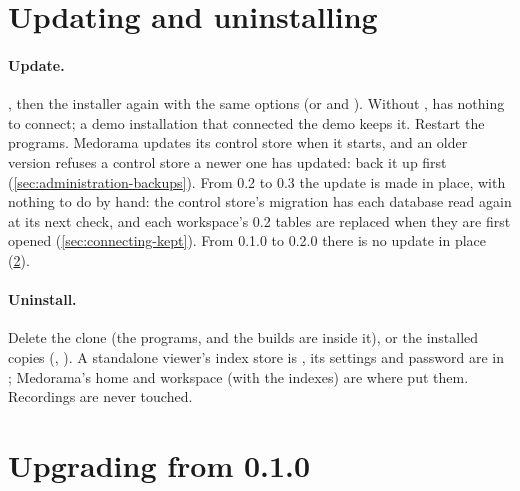 \section{Updating and uninstalling}
\label{sec:installation-update}

\paragraph{Update.} , then the installer again with the same options (or
 and ). Without
,  has nothing to connect; a demo installation that
connected the demo keeps it. Restart the programs. Medorama updates its control store when it starts, and an
older version refuses a control store a newer one has updated: back it up first
(\cref{sec:administration-backups}). From 0.2 to 0.3 the update is made in place, with nothing
to do by hand: the control store's migration has each database read again at its next check,
and each workspace's 0.2 tables are replaced when they are first opened
(\cref{sec:connecting-kept}). From 0.1.0 to 0.2.0 there is no update in place
(\cref{sec:installation-upgrade}).

\paragraph{Uninstall.} Delete the clone (the programs,  and the builds are inside
it), or the installed copies (,
). A standalone viewer's index store is
, its settings and password are in
; Medorama's home and workspace (with the indexes) are where
 put them. Recordings are never touched.

\section{Upgrading from 0.1.0}
\label{sec:installation-upgrade}

